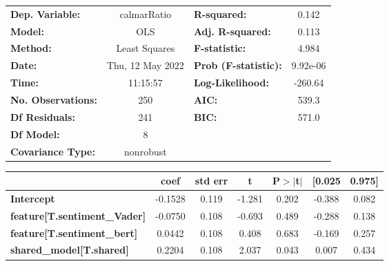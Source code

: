 \begin{center}
\begin{tabular}{lclc}
\toprule
\textbf{Dep. Variable:}                       &   calmarRatio    & \textbf{  R-squared:         } &     0.142   \\
\textbf{Model:}                               &       OLS        & \textbf{  Adj. R-squared:    } &     0.113   \\
\textbf{Method:}                              &  Least Squares   & \textbf{  F-statistic:       } &     4.984   \\
\textbf{Date:}                                & Thu, 12 May 2022 & \textbf{  Prob (F-statistic):} &  9.92e-06   \\
\textbf{Time:}                                &     11:15:57     & \textbf{  Log-Likelihood:    } &   -260.64   \\
\textbf{No. Observations:}                    &         250      & \textbf{  AIC:               } &     539.3   \\
\textbf{Df Residuals:}                        &         241      & \textbf{  BIC:               } &     571.0   \\
\textbf{Df Model:}                            &           8      & \textbf{                     } &             \\
\textbf{Covariance Type:}                     &    nonrobust     & \textbf{                     } &             \\
\bottomrule
\end{tabular}
\begin{tabular}{lcccccc}
                                              & \textbf{coef} & \textbf{std err} & \textbf{t} & \textbf{P$> |$t$|$} & \textbf{[0.025} & \textbf{0.975]}  \\
\midrule
\textbf{Intercept}                            &      -0.1528  &        0.119     &    -1.281  &         0.202        &       -0.388    &        0.082     \\
\textbf{feature[T.sentiment\_Vader]}          &      -0.0750  &        0.108     &    -0.693  &         0.489        &       -0.288    &        0.138     \\
\textbf{feature[T.sentiment\_bert]}           &       0.0442  &        0.108     &     0.408  &         0.683        &       -0.169    &        0.257     \\
\textbf{shared\_model[T.shared]}              &       0.2204  &        0.108     &     2.037  &         0.043        &        0.007    &        0.434     \\

\end{tabular}
\end{center}

